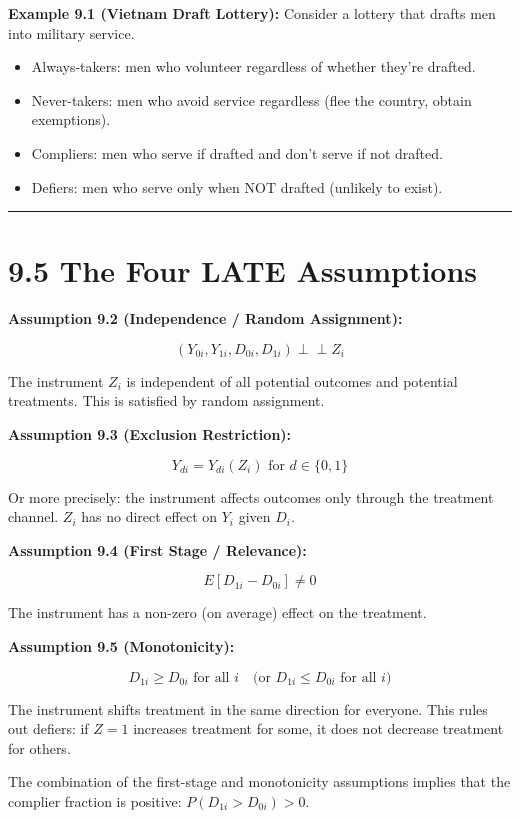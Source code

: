 \textbf{Example 9.1 (Vietnam Draft Lottery):} Consider a lottery that drafts men into military service. 
\begin{itemize}
\item Always-takers: men who volunteer regardless of whether they're drafted.
\item Never-takers: men who avoid service regardless (flee the country, obtain exemptions).
\item Compliers: men who serve if drafted and don't serve if not drafted.
\item Defiers: men who serve only when NOT drafted (unlikely to exist).
\end{itemize}

\medskip\hrule\medskip

\section{9.5 The Four LATE Assumptions}

\textbf{Assumption 9.2 (Independence / Random Assignment):}

\[
(Y_{0i}, Y_{1i}, D_{0i}, D_{1i}) \perp\!\!\!\perp Z_i
\]

The instrument $Z_i$ is independent of all potential outcomes and potential treatments. This is satisfied by random assignment.

\textbf{Assumption 9.3 (Exclusion Restriction):}

\[
Y_{di} = Y_{di}(Z_i) \text{ for } d \in \{0,1\}
\]

Or more precisely: the instrument affects outcomes only through the treatment channel. $Z_i$ has no direct effect on $Y_i$ given $D_i$.

\textbf{Assumption 9.4 (First Stage / Relevance):}

\[
E[D_{1i} - D_{0i}] \neq 0
\]

The instrument has a non-zero (on average) effect on the treatment. 

\textbf{Assumption 9.5 (Monotonicity):}

\[
D_{1i} \geq D_{0i} \text{ for all } i \quad \text{(or } D_{1i} \leq D_{0i} \text{ for all } i)
\]

The instrument shifts treatment in the same direction for everyone. This rules out defiers: if $Z = 1$ increases treatment for some, it does not decrease treatment for others.

The combination of the first-stage and monotonicity assumptions implies that the complier fraction is positive: $P(D_{1i} > D_{0i}) > 0$.

